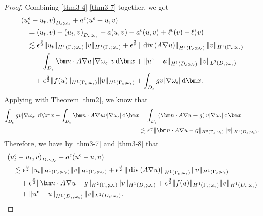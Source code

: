 \documentclass[3p,times]{elsarticle}
\numberwithin{equation}{section}
\newcommand{\dd}{\,{\rm d}}
\newcommand{\divo}{\,{\rm div}}
\begin{document}
\begin{proof}
	
	Combining \eqref{thm3-4}-\eqref{thm3-7} together, we get
	\begin{equation}
		\label{thm3-8}
		\begin{aligned}
			&\left(u_t^{\epsilon}-u_t,v\right)_{D_{\epsilon};\omega_{\epsilon}}+a^{\epsilon}(u^{\epsilon}-u,v)\\
			&\quad=\left(u_t,v\right)-\left(u_t,v\right)_{D_{\epsilon};\omega_{\epsilon}}+a(u,v)-a^{\epsilon}(u,v)+\ell^{\epsilon}(v)-\ell(v)\\	
			&\quad\lesssim\epsilon^{\frac 3 2}\|u_t\|_{H^1(\Gamma_{\epsilon};\omega_{\epsilon})}\|v\|_{H^1(\Gamma_{\epsilon};\omega_{\epsilon})}+\epsilon^{\frac 3 2}\left\|\divo\left(A\nabla u\right)\right\|_{H^1(\Gamma_{\epsilon};\omega_{\epsilon})}\|v\|_{H^1(\Gamma_{\epsilon};\omega_{\epsilon})}\\
			&\qquad-\int_{D_{\epsilon}} \bm n\cdot A\nabla u\left|\nabla\omega_{\epsilon}\right|v\dd\bm x+\left\|u^{\epsilon}-u\right\|_{H^1(D_{\epsilon};\omega_{\epsilon})}\|v\|_{L^2(D_{\epsilon};\omega_{\epsilon})}\\
			&\qquad+\epsilon^{\frac 3 2}\|f(u)\|_{H^1(\Gamma_{\epsilon};\omega_{\epsilon})}\|v\|_{H^1(\Gamma_{\epsilon};\omega_{\epsilon})}+\int_{D_{\epsilon}} gv|\nabla\omega_{\epsilon}|\dd \bm x.
		\end{aligned}
	\end{equation}
	Applying with Theorem \ref{thm2}, we know that
	\begin{equation}\label{thm3-9}
		\begin{aligned}
			\int_{D_{\epsilon}} gv|\nabla\omega_{\epsilon}|\dd \bm x-\int_{D_{\epsilon}}\bm n\cdot A\nabla uv|\nabla\omega_{\epsilon}|\dd \bm x
			&=\int_{D_{\epsilon}}\left(\bm n\cdot A\nabla u-g \right)v|\nabla \omega_{\epsilon}|\dd \bm x\notag\\
			&\lesssim\epsilon^{\frac 3 2}\|\bm n\cdot A\nabla u-g\|_{H^2(\Gamma_{\epsilon};\omega_{\epsilon})}\|v\|_{H^1(D_{\epsilon};\omega_{\epsilon})}.
		\end{aligned}
	\end{equation}
	Therefore, we have by  \eqref{thm3-7}   and \eqref{thm3-8} that
	\begin{equation}\label{thm3-10}
		\begin{aligned}
			&\left(u_t^{\epsilon}-u_t,v\right)_{D_{\epsilon};\omega_{\epsilon}}+a^{\epsilon}(u^{\epsilon}-u,v)\\
			&\quad\lesssim\epsilon^{\frac 3 2}\|u_t\|_{H^1(\Gamma_{\epsilon};\omega_{\epsilon})}\|v\|_{H^1(\Gamma_{\epsilon};\omega_{\epsilon})}+\epsilon^{\frac 3 2}\left\|\divo\left(A\nabla u\right)\right\|_{H^1(\Gamma_{\epsilon};\omega_{\epsilon})}\|v\|_{H^1(\Gamma_{\epsilon};\omega_{\epsilon})}\\
			&\qquad+\epsilon^{\frac 3 2}\|\bm n\cdot A\nabla u-g\|_{H^2(\Gamma_{\epsilon};\omega_{\epsilon})}\|v\|_{H^1(D_{\epsilon};\omega_{\epsilon})}+\epsilon^{\frac 3 2}\|f(u)\|_{H^1(\Gamma_{\epsilon};\omega_{\epsilon})}\|v\|_{H^1(D_{\epsilon};\omega_{\epsilon})}\\
			&\qquad +\left\|u^{\epsilon}-u\right\|_{H^1(D_{\epsilon};\omega_{\epsilon})}\|v\|_{L^2(D_{\epsilon};\omega_{\epsilon})}.
		\end{aligned}
	\end{equation}
	

\end{proof}
\end{document}
